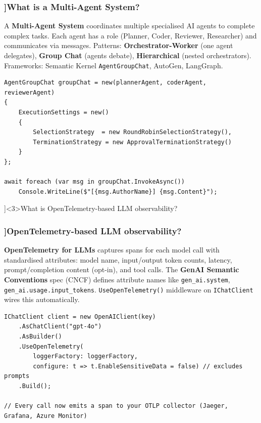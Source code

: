 \begin{frame}[fragile]
  \frametitle{\AnswerTitle[\CategoryBadge[AiToolColor!20]{AI Tools \& LLMs}]{What is a Multi-Agent System?}}

  {\footnotesize
  A \textbf{Multi-Agent System} coordinates multiple specialised AI agents to complete complex tasks. Each agent has a role (Planner, Coder, Reviewer, Researcher) and communicates via messages. Patterns: \textbf{Orchestrator-Worker} (one agent delegates), \textbf{Group Chat} (agents debate), \textbf{Hierarchical} (nested orchestrators). Frameworks: Semantic Kernel \texttt{AgentGroupChat}, AutoGen, LangGraph.
  }

  \begin{verbatim}
AgentGroupChat groupChat = new(plannerAgent, coderAgent, reviewerAgent)
{
    ExecutionSettings = new()
    {
        SelectionStrategy  = new RoundRobinSelectionStrategy(),
        TerminationStrategy = new ApprovalTerminationStrategy()
    }
};

await foreach (var msg in groupChat.InvokeAsync())
    Console.WriteLine($"[{msg.AuthorName}] {msg.Content}");
  \end{verbatim}
\end{frame}

\QuestionSlide[\CategoryBadge[AiToolColor!20]{AI Tools \& LLMs}]<3>{What is OpenTelemetry-based LLM observability?}

\begin{frame}[fragile]
  \frametitle{\AnswerTitle[\CategoryBadge[AiToolColor!20]{AI Tools \& LLMs}]{OpenTelemetry-based LLM observability?}}

  {\footnotesize
  \textbf{OpenTelemetry for LLMs} captures spans for each model call with standardised attributes: model name, input/output token counts, latency, prompt/completion content (opt-in), and tool calls. The \textbf{GenAI Semantic Conventions} spec (CNCF) defines attribute names like \texttt{gen\_ai.system}, \texttt{gen\_ai.usage.input\_tokens}. \texttt{UseOpenTelemetry()} middleware on \texttt{IChatClient} wires this automatically.
  }

  \begin{verbatim}
IChatClient client = new OpenAIClient(key)
    .AsChatClient("gpt-4o")
    .AsBuilder()
    .UseOpenTelemetry(
        loggerFactory: loggerFactory,
        configure: t => t.EnableSensitiveData = false) // excludes prompts
    .Build();

// Every call now emits a span to your OTLP collector (Jaeger, Grafana, Azure Monitor)
  \end{verbatim}
\end{frame}
